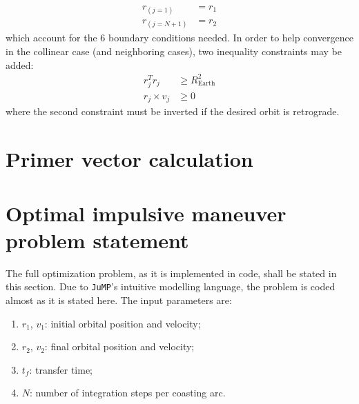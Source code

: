 \begin{align}
    r_{(j=1)} &= r_1 \\
    r_{(j=N+1)} &= r_2
\end{align}
which account for the 6 boundary conditions needed. In order to help convergence in the collinear case (and neighboring cases), two inequality constraints may be added:
\begin{align}
    r_j^T r_j &\geq R_{\text{Earth}}^2 \\
    r_j \times v_j &\geq 0
\end{align}
where the second constraint must be inverted if the desired orbit is retrograde. 

\section{Primer vector calculation}



\section{Optimal impulsive maneuver problem statement}\label{sec:impulsive_statement}

The full optimization problem, as it is implemented in code, shall be stated in this section. Due to \texttt{JuMP}'s intuitive modelling language, the problem is coded almost as it is stated here. The input parameters are:
\begin{enumerate}
    \item \(r_1\), \(v_1\): initial orbital position and velocity;
    \item \(r_2\), \(v_2\): final orbital position and velocity;
    \item \(t_f\): transfer time;
    \item \(N\): number of integration steps per coasting arc.
\end{enumerate}

